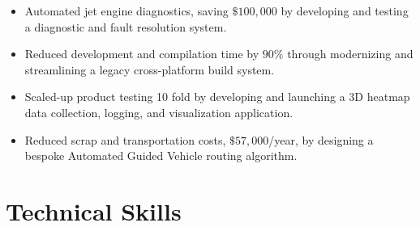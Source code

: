 \documentclass[11pt,a4paper,sans]{moderncv} %
\begin{document}

{
\begin{itemize}
	\item Automated jet engine diagnostics, saving $\$100,000$ by developing and testing a diagnostic and fault resolution system.
	\item Reduced development and compilation time by $90\%$ through modernizing and streamlining a legacy cross-platform build system.
\end{itemize}
}


{
\begin{itemize}
	\item Scaled-up product testing 10 fold by developing and launching a 3D heatmap data collection, logging, and visualization application.
\end{itemize}
}


{
\begin{itemize}
	\item Reduced scrap and transportation costs, $\$57,000$/year, by designing a bespoke Automated Guided Vehicle routing algorithm.
\end{itemize}
}


\section{Technical Skills}
\end{document}
